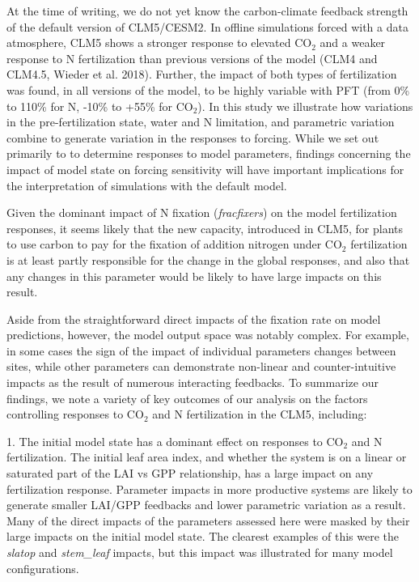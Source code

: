 \documentclass[draft,linenumbers]{agujournal}
\begin{document}
At the time of writing, we do not yet know the carbon-climate feedback strength of the default version of CLM5/CESM2. In offline simulations forced with a data atmosphere, CLM5 shows a stronger response to elevated CO$_{2}$ and a weaker response to N fertilization than previous versions of the model (CLM4 and CLM4.5, Wieder et al. 2018). Further, the impact of both types of fertilization was found, in all versions of the model, to be highly variable with PFT (from 0\% to 110\% for N, -10\% to +55\% for CO$_{2}$). In this study we illustrate how variations in the pre-fertilization state, water and N limitation, and parametric variation combine to generate variation in the responses to forcing. While we set out primarily to to determine responses to model parameters, findings concerning the impact of model state on forcing sensitivity will have important implications for the interpretation of simulations with the default model. 

Given the dominant impact of N fixation (\emph{fracfixers}) on the model fertilization responses, it seems likely that the new capacity, introduced in CLM5, for plants to use carbon to pay for the fixation of addition nitrogen under CO$_{2}$ fertilization is at least partly responsible for the change in the global responses, and also that any changes in this parameter would be likely to have large impacts on this result. 

Aside from the straightforward direct impacts of the fixation rate on model predictions, however, the model output space was notably complex. For example,  in some cases the sign of the impact of individual parameters changes between sites, while other parameters can demonstrate non-linear and counter-intuitive impacts as the result of numerous interacting feedbacks.  To summarize our findings, we note a variety of key outcomes of our analysis on the factors controlling responses to CO$_{2}$ and N fertilization in the CLM5, including:

1. The initial model state has a dominant effect on  responses to CO$_{2}$ and N fertilization. The initial leaf area index, and whether the system is on a linear or saturated part of the LAI vs GPP relationship, has a large impact on any fertilization response. Parameter impacts in more productive systems are likely to generate smaller LAI/GPP feedbacks and lower parametric variation as a result. Many of the direct impacts of the parameters assessed here were masked by their large impacts on the initial model state.  The clearest examples of this were the \emph{slatop} and \emph{stem\_leaf} impacts, but this impact was illustrated for many model configurations. 
\end{document}

